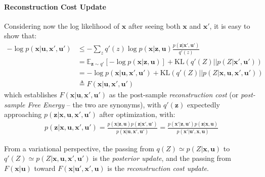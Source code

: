 \documentclass[12pt,twoside,openright]{article}
\begin{document}
\paragraph{Reconstruction Cost Update}
Considering now the {\color{Purple} log likelihood of $\boldsymbol{x}$ after seeing both $\boldsymbol{x}$ and $\boldsymbol{x}'$}, it is easy to show that:
\begin{align}
-\log p(\boldsymbol{x}| \boldsymbol{u}, \boldsymbol{x}', \boldsymbol{u}') 
&\leq - \sum_z q'(z) \log p(\boldsymbol{x}| \boldsymbol{z}, \boldsymbol{u}) \frac{p(\boldsymbol{z} |\boldsymbol{x}', \boldsymbol{u}')} {q'(z)}  \nonumber\\
&= \mathbb{E}_{\boldsymbol{z} \sim q'} \left[-\log p(\boldsymbol{x}| \boldsymbol{z}, \boldsymbol{u})\right] + \text{KL}(q'(Z)||p(Z|\boldsymbol{x}',\boldsymbol{u}'))
\label{eq:FEP-uxu}\\
&=  -\log p(\boldsymbol{x}| \boldsymbol{u}, \boldsymbol{x}',\boldsymbol{u}') + \text{KL}(q'(Z)||p(Z|\boldsymbol{x},\boldsymbol{u},\boldsymbol{x}',\boldsymbol{u}'))
\label{eq:FEP-uxu2}\\
&\triangleq F(\boldsymbol{x}|\boldsymbol{u}, \boldsymbol{x}', \boldsymbol{u}')\nonumber
\end{align}
which establishes $F(\boldsymbol{x}|\boldsymbol{u}, \boldsymbol{x}', \boldsymbol{u}')$ as the post-sample \emph{reconstruction cost} {\color{Purple} (or \emph{post-sample Free Energy} -- the two are synonyms)}, with $q'(\boldsymbol{z})$ expectedly approaching  $p(\boldsymbol{z}|\boldsymbol{x}, \boldsymbol{u}, \boldsymbol{x}', \boldsymbol{u}')$ after optimization,
with:
\begin{align} p(\boldsymbol{z}|\boldsymbol{x}, \boldsymbol{u}, \boldsymbol{x}', \boldsymbol{u}') = \frac{p(\boldsymbol{x}|\boldsymbol{z}, \boldsymbol{u})p(\boldsymbol{z}|\boldsymbol{x}', \boldsymbol{u}')}{p(\boldsymbol{x}|\boldsymbol{u},\boldsymbol{x}',\boldsymbol{u}')}
= \frac{p(\boldsymbol{x}'|\boldsymbol{z}, \boldsymbol{u}')p(\boldsymbol{z}|\boldsymbol{x}, \boldsymbol{u})}{p(\boldsymbol{x}'|\boldsymbol{u}',\boldsymbol{x},\boldsymbol{u})}
\end{align} 

From a variational perspective, the passing from $q(Z) \simeq p(Z|\boldsymbol{x}, \boldsymbol{u})$ to $q'(Z) \simeq p(Z|\boldsymbol{x}, \boldsymbol{u}, \boldsymbol{x}', \boldsymbol{u}')$ is the \emph{posterior update}, and the passing from $F(\boldsymbol{x}|\boldsymbol{u})$ toward   $F(\boldsymbol{x}|\boldsymbol{u}', \boldsymbol{x}', \boldsymbol{u})$ is the \emph{reconstruction cost update}. 
\end{document}
